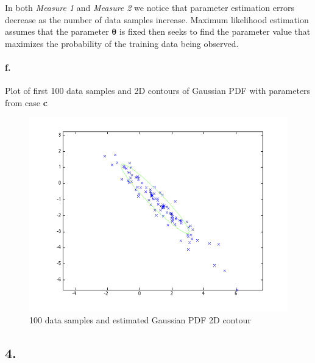 \documentclass[a4paper]{article}
\begin{document}
In both \emph{Measure 1} and \emph{Measure 2} we notice that parameter estimation errors decrease as the number of data samples increase. Maximum likelihood estimation assumes that the parameter $\boldsymbol{\theta}$ is fixed then seeks to find the parameter value that maximizes the probability of the training data being observed.

\paragraph{f.} Plot of first 100 data samples and 2D contours of Gaussian PDF with parameters from case \textbf{c}  \\
\begin{figure}[H]
  \centering
    \includegraphics[scale=.47]{images/3_f_II.png}
  \caption{100 data samples and estimated Gaussian PDF 2D contour}
\end{figure}

\subsection*{4.}

\end{document}
